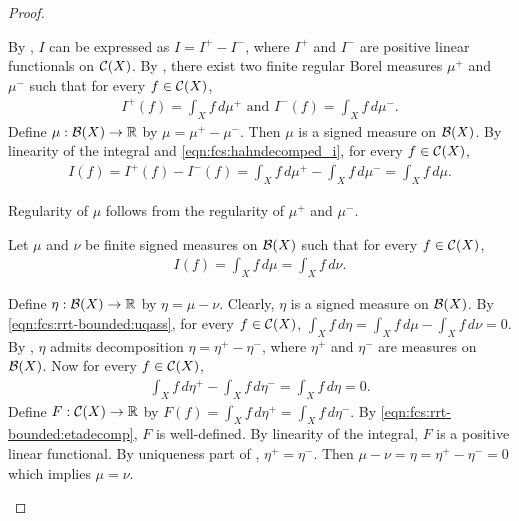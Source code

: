 \begin{proof}
\setcounter{step}{0}
\begin{step}[Existence]
By , $I$ can be expressed as $I = I^{+} - I^{-}$, where $I^{+}$ and $I^{-}$ are positive linear functionals on ${\mathcal C}(X)$. By , there exist two finite regular Borel measures $\mu^{+}$ and $\mu^{-}$ such that for every $f \in {\mathcal C}(X)$, \begin{align}
\label{eqn:fcs:hahndecomped_i}
I^{+}(f) = \int_X f \,d\mu^{+} \text{ and } I^{-}(f) = \int_X f \,d\mu^{-}.
\end{align}
Define $\mu : {\mathcal B}(X) \to {\mathbb R}$ by $\mu = \mu^{+} - \mu^{-}$. Then $\mu$ is a signed measure on ${\mathcal B}(X)$. By linearity of the integral and \ref{eqn:fcs:hahndecomped_i}, for every $f \in {\mathcal C}(X)$, 
\begin{align*}
    I(f) =  I^{+}(f) - I^{-}(f) =  \int_X f \,d\mu^{+} -  \int_X f \,d\mu^{-} = \int_{X} f \, d\mu.
\end{align*}
\end{step}
\begin{step}[Regularity]
Regularity of $\mu$ follows from the regularity of $\mu^{+}$ and $\mu^{-}$. 
\end{step}
\begin{step}[Uniqueness]
Let $\mu$ and $\nu$ be finite signed measures on ${\mathcal B}(X)$ such that for every $f \in {\mathcal C}(X)$, \begin{align}
    \label{eqn:fcs:rrt-bounded:uqass}
    I(f) = \int_X f \,d\mu = \int_X f \,d\nu.  
\end{align}

Define $\eta : {\mathcal B}(X) \to {\mathbb R}$ by $\eta = \mu - \nu$. Clearly, $\eta$ is a signed measure on ${\mathcal B}(X)$. By \ref{eqn:fcs:rrt-bounded:uqass}, for every $f \in {\mathcal C}(X)$, $\int_X f \, d\eta = \int_X f \, d\mu- \int_X f \, d\nu  = 0$. By , $\eta$ admits decomposition $\eta = \eta^{+} - \eta^{-}$, where $\eta^{+}$ and $\eta^{-}$ are measures on ${\mathcal B}(X)$. Now for every $f \in {\mathcal C}(X)$, \begin{align}
      \label{eqn:fcs:rrt-bounded:etadecomp}
      \int_{X} f \,d\eta^{+} - \int_{X} f \,d\eta^{-} = \int_{X} f \,d\eta = 0.
\end{align}
Define $F : {\mathcal C}(X) \to {\mathbb R}$ by $F(f) =  \int_{X} f \,d\eta^{+} = \int_{X} f \,d\eta^{-}$. By \ref{eqn:fcs:rrt-bounded:etadecomp}, $F$ is well-defined.
By linearity of the integral, $F$ is a positive linear functional. By uniqueness part of , $\eta^{+} = \eta^{-}$. Then $\mu - \nu = \eta = \eta^{+} - \eta^{-} = 0$ which implies $\mu = \nu$.

\end{step}
\end{proof}
